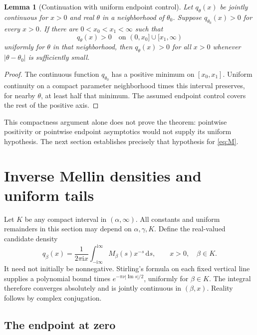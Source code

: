 \documentclass[11pt,a4paper]{article}
\numberwithin{equation}{section}
\newtheorem{lemma}[theorem]{Lemma}
\theoremstyle{definition}\newtheorem{definition}[theorem]{Definition}
\theoremstyle{remark}\newtheorem{remark}[theorem]{Remark}
\newcommand{\ii}{\mathrm i}
\newcommand{\dd}{\,\mathrm d}
\DeclareMathOperator{\Ima}{Im}
\begin{document}
\begin{lemma}[Continuation with uniform endpoint control]\label{lem:continue}
Let \(q_\theta(x)\) be jointly continuous for \(x>0\) and real
\(\theta\) in a neighborhood of \(\theta_0\). Suppose
\(q_{\theta_0}(x)>0\) for every \(x>0\). If there are
\(0<x_0<x_1<\infty\) such that
\[
 q_\theta(x)>0\quad\text{on }(0,x_0]\cup[x_1,\infty)
\]
uniformly for \(\theta\) in that neighborhood, then
\(q_\theta(x)>0\) for all \(x>0\) whenever
\(|\theta-\theta_0|\) is sufficiently small.
\end{lemma}
\begin{proof}
The continuous function \(q_{\theta_0}\) has a positive minimum on
\([x_0,x_1]\). Uniform continuity on a compact parameter neighborhood
times this interval preserves, for nearby \(\theta\), at least half
that minimum. The assumed endpoint control covers the rest of the
positive axis.
\end{proof}

This compactness argument alone does not prove the theorem: pointwise
positivity or pointwise endpoint asymptotics would not supply its
uniform hypothesis. The next section establishes precisely that
hypothesis for \eqref{eq:M}.

\section{Inverse Mellin densities and uniform tails}

Let \(K\) be any compact interval in \((\alpha,\infty)\).
All constants and uniform remainders in this section may depend on
\(\alpha,\gamma,K\). Define the real-valued candidate density
\begin{equation}\label{eq:q}
 q_\beta(x)=\frac1{2\pi\ii x}
 \int_{-\ii\infty}^{\ii\infty}M_\beta(s)x^{-s}\dd s,
 \qquad x>0,\quad\beta\in K.
\end{equation}
It need not initially be nonnegative. Stirling's formula on each fixed
vertical line supplies a polynomial bound times
\(e^{-\pi\nu|\Ima s|/2}\), uniformly for \(\beta\in K\).
The integral therefore converges absolutely and is jointly continuous
in \((\beta,x)\). Reality follows by complex conjugation.

\subsection{The endpoint at zero}
\end{document}
